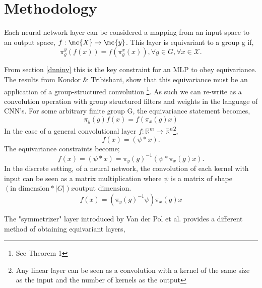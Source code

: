 \chapter{Methodology} \label{Chap3}

Each neural network layer can be considered a mapping from an input space to an output space, $f :\mc{X} \rightarrow \mc{y}$. This layer is equivariant to a group g if,
\begin{equation}
\label{equiv_layer}
    \pi_g^y( f(x) )= f(\pi_g^x( x)), \forall g \in G, \forall x \in \mathcal{X}.
\end{equation}

From section \ref{dnninv} this is the key constraint for an MLP to obey equivariance. The results from Kondor & Tribishani\cite{kondor_2018_equiv}, show that this equivariance must be an application of a group-structured convolution \footnote{See Theorem 1}. 
As such we can re-write \label{equiv_layer} as a convolution operation with group structured filters and weights in the language of CNN's. For some arbitrary finite group G, the equivariance statement becomes, 
$$
\pi_y(g)f(x) = f(\pi_x(g)x)
$$
In the case of a general convolutional layer $f: \mathbb{R}^m \rightarrow \mathbb{R}^n$\footnote{Any linear layer can be seen as a convolution with a kernel of the same size as the input and the number of kernels as the output},
$$
f(x) = (\psi * x).
$$
The equivariance constraints become;
$$
f(x) =(\psi * x) = \pi_y(g)^{-1}(\psi * \pi_x(g)x).
$$
In the discrete setting, of a neural network, the convolution of each kernel with input can be seen as a matrix multiplication where $\psi$ is a matrix of shape $(\text{in dimension} * |G|) x \text{output dimension}$. 
$$
f(x)= (\pi_y(g)^{-1} \psi) \pi_x(g) x
$$


The "symmetrizer" layer introduced by Van der Pol et al.\cite{vanderpol_2020_mdp_homomorphic} provides a different method of obtaining equivariant layers, 